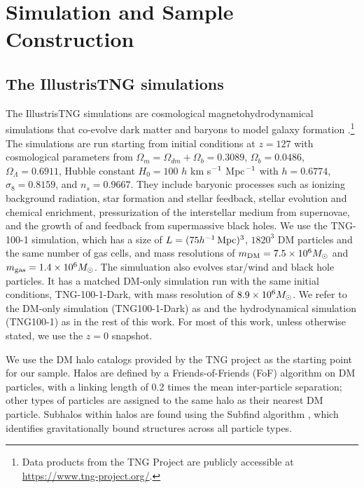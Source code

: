 \section{Simulation and Sample Construction}
\label{sec:sim_sample}

\subsection{The IllustrisTNG simulations}
\label{sec:sim}

The IllustrisTNG simulations are cosmological magnetohydrodynamical simulations that co-evolve dark matter and baryons to model galaxy formation \citep{springel_first_2018,nelson_first_2018,pillepich_first_2018,naiman_first_2018,marinacci_first_2018}.\footnote{Data products from the TNG Project are publicly accessible at \url{https://www.tng-project.org/}.}
The simulations are run starting from initial conditions at $z=127$ with cosmological parameters from \cite{ade_planck_2016} $\Omega_m = \Omega_{dm} + \Omega_b = 0.3089$, $\Omega_b = 0.0486$, $\Omega_\Lambda = 0.6911$, Hubble constant $H_0 = 100$ $h$ km s$^{-1}$ Mpc$^{-1}$ with $h = 0.6774$, $\sigma_8 = 0.8159$, and $n_s = 0.9667$.
They include baryonic processes such as ionizing background radiation, star formation and stellar feedback, stellar evolution and chemical enrichment, pressurization of the interstellar medium from supernovae, and the growth of and feedback from supermassive black holes.   
We use the TNG-100-1 simulation, which has a size of $L = (75 h^{-1}\,\mathrm{Mpc})^3$, $1820^3$ DM particles and the same number of gas cells, and mass resolutions of $m_\text{DM} = 7.5 \times 10^6 M_\mathrm{\odot}$ and $m_\text{gas} = 1.4 \times 10^6 M_\mathrm{\odot}$.
The simuluation also evolves star/wind and black hole particles.
It has a matched DM-only simulation run with the same initial conditions, TNG-100-1-Dark, with mass resolution of $8.9 \times 10^6 M_\mathrm{\odot}$.
We refer to the DM-only simulation (TNG100-1-Dark) as \dark and the hydrodynamical simulation (TNG100-1) as \hydro in the rest of this work.
For most of this work, unless otherwise stated, we use the $z=0$ snapshot.

We use the DM halo catalogs provided by the TNG project as the starting point for our sample.
Halos are defined by a Friends-of-Friends (FoF) algorithm on DM particles, with a linking length of 0.2 times the mean inter-particle separation; other types of particles are assigned to the same halo as their nearest DM particle.
Subhalos within halos are found using the Subfind algorithm \citep{springel_populating_2001}, which identifies gravitationally bound structures across all particle types.


